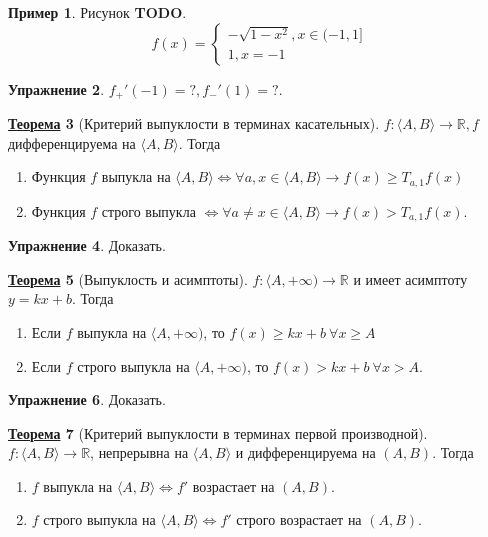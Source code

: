 \documentclass[12pt]{article}
\newenvironment{MyList}[1][4pt]{
  \begin{enumerate}[1.]
  \setlength{\parskip}{0pt}
  \setlength{\itemsep}{#1}
}{       
  \end{enumerate}
}
\def\TODO{{\color{red}\bf TODO}}
\def\R{\mathbb{R}}       %
\def\EQ{\Leftrightarrow} %
\theoremstyle{definition} %
\newtheorem{Thm}{\underline{Теорема}}[subsection] %
\newtheorem{Ex}[Thm]{Упражнение} %
\newtheorem{Example}[Thm]{Пример} %
\theoremstyle{plain} %
\theoremstyle{remark} %
\begin{document}
\begin{Example}
    Рисунок \TODO.
    \[f(x) = \begin{cases}
        -\sqrt{1 - x^2}, x \in (-1, 1] \\
        1, x = -1
    \end{cases}\]  
\end{Example}

\begin{Ex}
    $f_+'(-1) = ?, f_-'(1) = ?$.
\end{Ex}

\begin{Thm}[Критерий выпуклости в терминах касательных]
    $f : \langle A, B\rangle \to \R, f$ дифференцируема на $\langle A, B\rangle$. Тогда 
    \begin{MyList}
        \item Функция $f$ выпукла на $\langle A, B\rangle \EQ \forall a, x \in \langle A, B\rangle \to f(x) \geqslant T_{a, 1}f(x)$ 
        \item Функция $f$ строго выпукла $\EQ \forall a \neq x \in \langle A, B\rangle \to f(x) > T_{a, 1} f(x)$.
    \end{MyList}
\end{Thm}

\begin{Ex}
    Доказать.
\end{Ex}

\begin{Thm}[Выпуклость и асимптоты]
    $f : \langle A, +\infty) \to \R$ и имеет асимптоту $y = kx + b$.
    Тогда
    \begin{MyList}
        \item Если $f$ выпукла на $\langle A, +\infty)$, то $f(x) \geqslant kx + b \ \forall x \geqslant A$
        \item Если $f$ строго выпукла на $\langle A, +\infty)$, то $f(x) > kx + b \ \forall x > A$.
    \end{MyList}
\end{Thm}

\begin{Ex}
    Доказать.
\end{Ex}

\begin{Thm}[Критерий выпуклости в терминах первой производной]
    $f : \langle A, B\rangle \to \R$, непрерывна на $\langle A, B\rangle$ и дифференцируема на $(A, B)$. Тогда
    \begin{MyList}
        \item $f$ выпукла на $\langle A, B\rangle \EQ f'$ возрастает на $(A, B)$.
        \item $f$ строго выпукла на $\langle A, B\rangle \EQ f'$ строго возрастает на $(A, B)$.    
    \end{MyList} 
\end{Thm}
\end{document}
